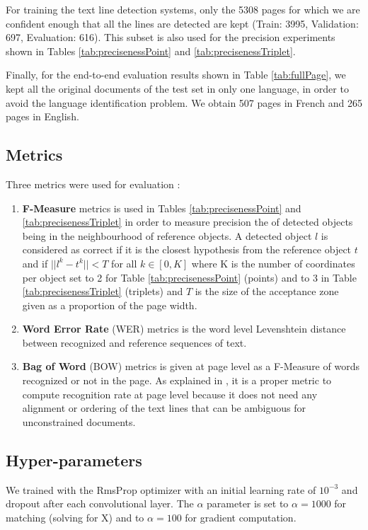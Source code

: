 \documentclass[conference]{IEEEtran}
\begin{document}
For training the text line detection systems, only the 5308 pages for which we are confident enough that all the lines are detected are kept (Train: 3995, Validation: 697, Evaluation: 616). This subset is also used for the precision experiments shown in Tables \ref{tab:precisenessPoint} and \ref{tab:precisenessTriplet}.

Finally, for the end-to-end evaluation results shown in Table \ref{tab:fullPage}, we kept all the original documents of the test set in only one language, in order to avoid the language identification problem. We obtain 507 pages in French and 265 pages in English.

\subsection{Metrics}
Three metrics were used for evaluation : 

\begin{enumerate}
	\item \textbf{F-Measure} metrics is used in Tables \ref{tab:precisenessPoint} and \ref{tab:precisenessTriplet} in order to measure precision the  of detected objects being in the neighbourhood of reference objects. A detected object $l$ is considered as correct if it is the closest hypothesis from the reference object $t$ and if $||l^k - t^k|| < T$ for all $k \in [0,K]$ where K is the number of coordinates per object set to 2 for Table \ref{tab:precisenessPoint} (points) and to 3 in Table \ref{tab:precisenessTriplet} (triplets) and $T$ is the size of the acceptance zone given as a proportion of the page width. 
	\item \textbf{Word Error Rate} (WER) metrics is the word level Levenshtein distance \cite{levenshtein1966binary} between recognized and reference sequences of text.
	\item \textbf{Bag of Word} (BOW) metrics is given at page level as a F-Measure of words recognized or not in the page. As explained in \cite{pletschacher2015europeana}, it is a proper metric to compute recognition rate at page level because it does not need any alignment or ordering of the text lines that can be ambiguous for unconstrained documents.
	
\end{enumerate} 



\subsection{Hyper-parameters}
We trained with the RmsProp optimizer \cite{tieleman2012lecture} with an initial learning rate of $10^{-3}$ and dropout after each convolutional layer. The $\alpha$ parameter is set to $\alpha{=}1000$ for matching (solving for X) and to $\alpha{=}100$ for gradient computation.
\end{document}
